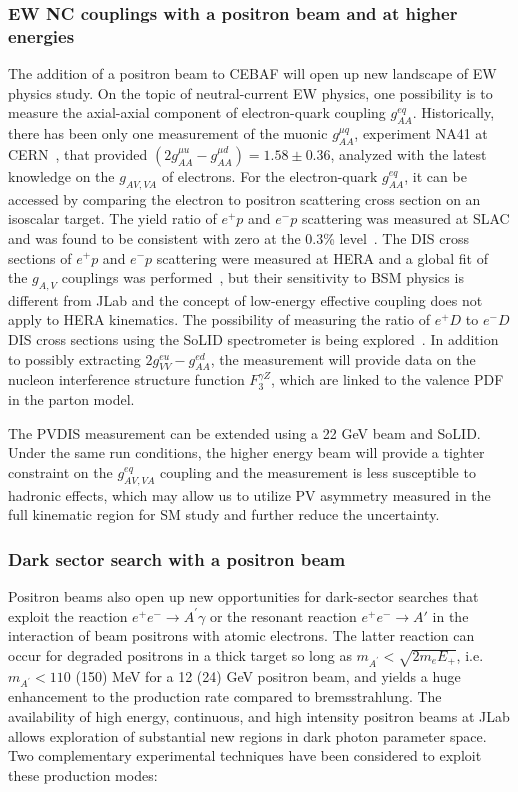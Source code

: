 \subsubsection{EW NC couplings with a positron beam and at higher energies}
The addition of a positron beam to CEBAF will open up new landscape of EW physics study. On the topic of neutral-current EW physics, one possibility is to measure the axial-axial component of electron-quark coupling $g_{AA}^{eq}$. Historically, there has been only one measurement of the muonic $g_{AA}^{\mu q}$, experiment NA41 at CERN~\cite{Argento:1982tq}, that provided $(2g_{AA}^{\mu u}-g_{AA}^{\mu d})=1.58\pm 0.36$, analyzed with the latest knowledge on the $g_{AV,VA}$ of electrons. For the electron-quark $g_{AA}^{eq}$, it can be accessed by comparing the electron to positron scattering cross section on an isoscalar target. The yield ratio of $e^+p$ and $e^-p$ scattering was measured at SLAC and was found to be consistent with zero at the 0.3\% level~\cite{Fancher:1976ea}. 
The DIS cross sections of $e^+p$ and $e^-p$ scattering were measured at HERA and a global fit of the $g_{A,V}$ couplings was performed~\cite{ZEUS:2016vyd,H1:2018mkk}, but their sensitivity to BSM physics is different from JLab and the concept of low-energy effective coupling does not apply to HERA kinematics. The possibility of measuring the ratio of $e^+D$ to $e^-D$ DIS cross sections using the SoLID spectrometer is being explored~\cite{PR12-21-006}. In addition to possibly extracting $2g_{VV}^{eu}-g_{AA}^{ed}$, the measurement will provide data on the nucleon interference structure function $F_3^{\gamma Z}$, which are linked to the valence PDF in the parton model. 

The PVDIS measurement can be extended using a 22 GeV beam and SoLID. Under the same run conditions, the higher energy beam will provide a tighter constraint on the $g_{AV,VA}^{eq}$ coupling and the measurement is less susceptible to hadronic effects, which may allow us to utilize PV asymmetry measured in the full kinematic region for SM study and further reduce the uncertainty. 

\subsubsection{Dark sector search with a positron beam}
Positron beams also open up new opportunities for dark-sector searches that exploit the reaction $e^+ e^- \rightarrow A^\prime \gamma$ or the resonant reaction $e^+ e^- \rightarrow A' $ in the interaction of beam positrons with atomic electrons.  The latter reaction can occur for degraded positrons in a thick target so long as $m_{A^\prime} < \sqrt{2 m_e E_+}$, i.e. $m_{A^\prime} < 110$ (150) MeV for a 12 (24) GeV positron beam, and yields a huge enhancement to the production rate compared to bremsstrahlung. The availability of high energy, continuous, and high intensity positron beams at JLab allows exploration of substantial new regions in dark photon parameter space. Two complementary experimental techniques have been considered to exploit these production modes: 

